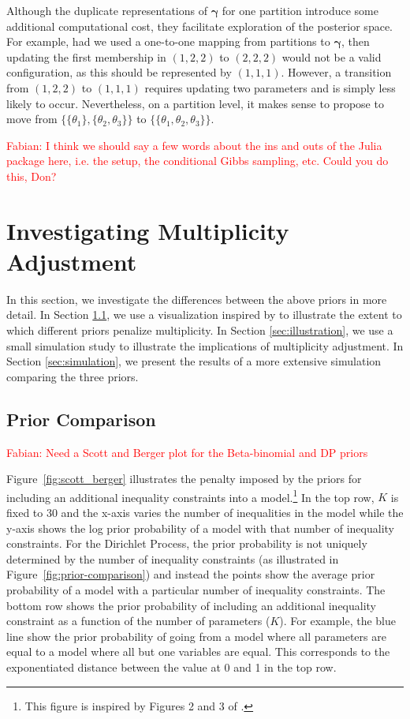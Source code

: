 \documentclass[11pt,a4paper]{article}
\theoremstyle{definition} %
\theoremstyle{case}
\newcommand{\FD}[1]{\textcolor{red}{Fabian: #1 }}
\begin{document}
Although the duplicate representations of $\bm{\gamma}$ for one partition introduce some additional computational cost, they facilitate exploration of the posterior space. For example, had we used a one-to-one mapping from partitions to $\bm{\gamma}$, then updating the first membership in $(1, 2, 2)$ to $(2, 2, 2)$ would not be a valid configuration, as this should be represented by $(1, 1, 1)$. However, a transition from $(1, 2, 2)$ to $(1, 1, 1)$ requires updating two parameters and is simply less likely to occur. Nevertheless, on a partition level, it makes sense to propose to move from $\{\{\theta_1\}, \{\theta_2, \theta_3\}\}$ to $\{\{\theta_1, \theta_2, \theta_3\}\}$.

\FD{I think we should say a few words about the ins and outs of the Julia package here, i.e. the setup, the conditional Gibbs sampling, etc. Could you do this, Don?}

\section{Investigating Multiplicity Adjustment} \label{sec:simulation-study}
In this section, we investigate the differences between the above priors in more detail. In Section \ref{sec:scott-berger}, we use a visualization inspired by \textcite{scott2006exploration} to illustrate the extent to which different priors penalize multiplicity. In Section \ref{sec:illustration}, we use a small simulation study to illustrate the implications of multiplicity adjustment. In Section \ref{sec:simulation}, we present the results of a more extensive simulation comparing the three priors.

\subsection{Prior Comparison} \label{sec:scott-berger}
\FD{Need a Scott and Berger plot for the Beta-binomial and DP priors}

Figure~\ref{fig:scott_berger} illustrates the penalty imposed by the priors for including an additional inequality constraints into a model.\footnote{This figure is inspired by Figures 2 and 3 of \textcite{scott2010bayes}.} In the top row, $K$ is fixed to 30 and the x-axis varies the number of inequalities in the model while the y-axis shows the log prior probability of a model with that number of inequality constraints. For the Dirichlet Process, the prior probability is not uniquely determined by the number of inequality constraints (as illustrated in Figure~\ref{fig:prior-comparison}) and instead the points show the average prior probability of a model with a particular number of inequality constraints. The bottom row shows the prior probability of including an additional inequality constraint as a function of the number of parameters ($K$). For example, the blue line show the prior probability of going from a model where all parameters are equal to a model where all but one variables are equal. This corresponds to the exponentiated distance between the value at 0 and 1 in the top row.
\end{document}
